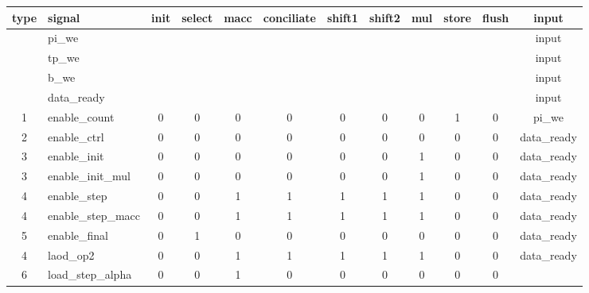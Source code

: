 \documentclass[mscthesis]{usiinfthesis}
\begin{document}
\begin{table}
    \scriptsize
    \begin{center}
    \begin{tabular}{|c|l|*{10}{c|}}
    \hline
    type & signal                      & init & select & macc & conciliate & shift1 & shift2 & mul & store & flush & input       \\
    \hline
    \hline
         & pi\_we                      &      &        &      &            &        &        &      &      &       & input       \\
         & tp\_we                      &      &        &      &            &        &        &      &      &       & input       \\
         & b\_we                       &      &        &      &            &        &        &      &      &       & input       \\
         & data\_ready                 &      &        &      &            &        &        &      &      &       & input       \\
    1    & enable\_count               & 0    & 0      & 0    & 0          & 0      & 0      & 0    & 1    & 0     & pi\_we      \\
    2    & enable\_ctrl                & 0    & 0      & 0    & 0          & 0      & 0      & 0    & 0    & 0     & data\_ready \\
    3    & enable\_init                & 0    & 0      & 0    & 0          & 0      & 0      & 1    & 0    & 0     & data\_ready \\
    3    & enable\_init\_mul           & 0    & 0      & 0    & 0          & 0      & 0      & 1    & 0    & 0     & data\_ready \\
    4    & enable\_step                & 0    & 0      & 1    & 1          & 1      & 1      & 1    & 0    & 0     & data\_ready \\
    4    & enable\_step\_macc          & 0    & 0      & 1    & 1          & 1      & 1      & 1    & 0    & 0     & data\_ready \\
    5    & enable\_final               & 0    & 1      & 0    & 0          & 0      & 0      & 0    & 0    & 0     & data\_ready \\
    4    & laod\_op2                   & 0    & 0      & 1    & 1          & 1      & 1      & 1    & 0    & 0     & data\_ready \\
    6    & load\_step\_alpha           & 0    & 0      & 1    & 0          & 0      & 0      & 0    & 0    & 0     &             \\

\end{tabular}
\end{center}
\end{table}
\end{document}
